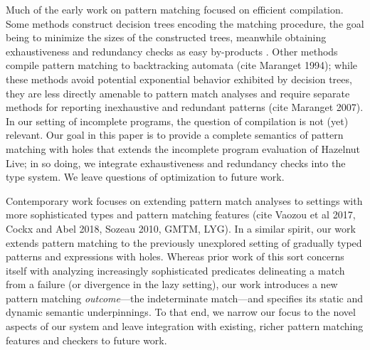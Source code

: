 Much of the early work on pattern matching focused on efficient compilation. Some methods construct decision trees encoding the matching procedure, the goal being to minimize the sizes of the constructed trees, meanwhile obtaining exhaustiveness and redundancy checks as easy by-products \cite{Aitken92smlnj,Baudinet85treepattern,Sestoft96mlpattern}.
Other methods compile pattern matching to backtracking automata \cite{DBLP:journals/jfp/Maranget07}(cite Maranget 1994);
while these methods avoid potential exponential behavior exhibited by decision trees, they are less directly amenable to pattern match analyses and require separate methods for reporting inexhaustive and redundant patterns (cite Maranget 2007).
In our setting of incomplete programs, the question of compilation is not (yet) relevant. Our goal in this paper is to provide a complete semantics of pattern matching with holes that extends the incomplete program evaluation of Hazelnut Live; in so doing, we integrate exhaustiveness and redundancy checks into the type system.
We leave questions of optimization to future work.

Contemporary work focuses on extending pattern match analyses to settings with more sophisticated types and pattern matching features (cite Vaozou et al 2017, Cockx and Abel 2018, Sozeau 2010, GMTM, LYG).
In a similar spirit, our work extends pattern matching to the previously unexplored setting of gradually typed patterns and expressions with holes.
Whereas prior work of this sort concerns itself with analyzing increasingly sophisticated predicates delineating a match from a failure (or divergence in the lazy setting), our work introduces a new pattern matching \emph{outcome}---the indeterminate match---and specifies its static and dynamic semantic underpinnings.
To that end, we narrow our focus to the novel aspects of our system and leave integration with existing, richer pattern matching features and checkers to future work.




